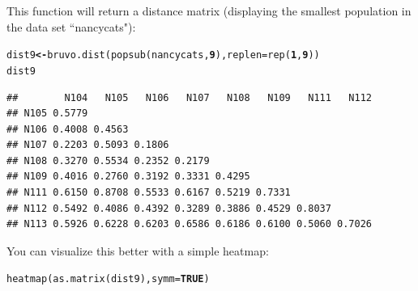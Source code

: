 \documentclass[letterpaper]{article}\usepackage[]{graphicx}\usepackage[]{color}
\makeatletter
\newcommand{\hlnum}[1]{\textcolor[rgb]{0.502,0,0.502}{\textbf{#1}}}%
\newcommand{\hlstd}[1]{\textcolor[rgb]{0,0,0}{#1}}%
\newcommand{\hlkwb}[1]{\textcolor[rgb]{0.502,0.502,0.753}{\textbf{#1}}}%
\newcommand{\hlkwc}[1]{\textcolor[rgb]{0,0.502,0.753}{#1}}%
\newcommand{\hlkwd}[1]{\textcolor[rgb]{0,0.267,0.4}{#1}}%
\newenvironment{kframe}{%
 \def\at@end@of@kframe{}%
 \ifinner\ifhmode%
  \def\at@end@of@kframe{\end{minipage}}%
  \begin{minipage}{\columnwidth}%
 \fi\fi%
 \def\FrameCommand##1{\hskip\@totalleftmargin \hskip-\fboxsep
 \colorbox{shadecolor}{##1}\hskip-\fboxsep
     \hskip-\linewidth \hskip-\@totalleftmargin \hskip\columnwidth}%
 \MakeFramed {\advance\hsize-\width
   \@totalleftmargin\z@ \linewidth\hsize
   \@setminipage}}%
 {\par\unskip\endMakeFramed%
 \at@end@of@kframe}
\newenvironment{knitrout}{}{} %
\makeatother
\begin{document}
This function will return a distance matrix (displaying the smallest population in the data set ``nancycats"):
\begin{knitrout}\footnotesize
{}\color{fgcolor}\begin{kframe}
\begin{alltt}
\hlstd{dist9} \hlkwb{<-} \hlkwd{bruvo.dist}\hlstd{(}\hlkwd{popsub}\hlstd{(nancycats,} \hlnum{9}\hlstd{),} \hlkwc{replen} \hlstd{=} \hlkwd{rep}\hlstd{(}\hlnum{1}\hlstd{,} \hlnum{9}\hlstd{))}
\hlstd{dist9}
\end{alltt}
\begin{verbatim}
##        N104   N105   N106   N107   N108   N109   N111   N112
## N105 0.5779                                                 
## N106 0.4008 0.4563                                          
## N107 0.2203 0.5093 0.1806                                   
## N108 0.3270 0.5534 0.2352 0.2179                            
## N109 0.4016 0.2760 0.3192 0.3331 0.4295                     
## N111 0.6150 0.8708 0.5533 0.6167 0.5219 0.7331              
## N112 0.5492 0.4086 0.4392 0.3289 0.3886 0.4529 0.8037       
## N113 0.5926 0.6228 0.6203 0.6586 0.6186 0.6100 0.5060 0.7026
\end{verbatim}
\end{kframe}
\end{knitrout}


You can visualize this better with a simple heatmap:

\begin{knitrout}\footnotesize
{}\color{fgcolor}\begin{kframe}
\begin{alltt}
\hlkwd{heatmap}\hlstd{(}\hlkwd{as.matrix}\hlstd{(dist9),} \hlkwc{symm} \hlstd{=} \hlnum{TRUE}\hlstd{)}
\end{alltt}
\end{kframe}
\end{knitrout}
\end{document}
